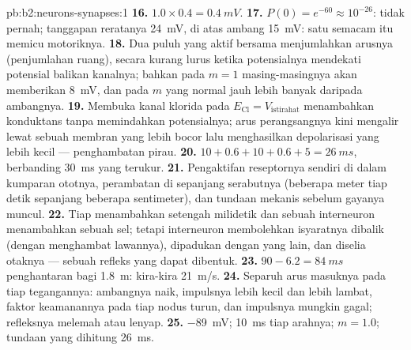 \begin{solution}{pb:b2:neurons-synapses:1}
\textbf{16.} $1.0\times 0.4 = \qty{0.4}{mV}$.
\textbf{17.} $P(0) = e^{-60} \approx 10^{-26}$: tidak pernah;
tanggapan reratanya \qty{24}{mV}, di atas ambang \qty{15}{mV}: satu
 semacam itu memicu  motoriknya.
\textbf{18.} Dua puluh  yang aktif bersama menjumlahkan arusnya
(penjumlahan ruang), secara kurang lurus ketika potensialnya mendekati
potensial balikan kanalnya; bahkan pada $m = 1$ masing-masingnya akan
memberikan \qty{8}{mV}, dan pada $m$ yang normal jauh lebih banyak
daripada ambangnya.
\textbf{19.} Membuka kanal klorida pada $E_{\mathrm{Cl}} = V_{\text{istirahat}}$
menambahkan konduktans tanpa memindahkan potensialnya; arus
perangsangnya kini mengalir lewat sebuah membran yang lebih bocor lalu
menghasilkan depolarisasi yang lebih kecil --- penghambatan pirau.
\textbf{20.} $10 + 0.6 + 10 + 0.6 + 5 = \qty{26}{ms}$, berbanding
\qty{30}{ms} yang terukur.
\textbf{21.} Pengaktifan reseptornya sendiri di dalam kumparan ototnya,
perambatan   di sepanjang serabutnya
(beberapa meter tiap detik sepanjang beberapa sentimeter), dan tundaan
mekanis sebelum gayanya muncul.
\textbf{22.} Tiap  menambahkan setengah milidetik dan sebuah
interneuron menambahkan sebuah sel; tetapi interneuron membolehkan
isyaratnya dibalik (dengan menghambat lawannya), dipadukan dengan yang
lain, dan diselia otaknya --- sebuah refleks yang dapat dibentuk.
\textbf{23.} $90 - 6.2 = \qty{84}{ms}$ penghantaran bagi \qty{1.8}{m}:
kira-kira \qty{21}{m/s}.
\textbf{24.} Separuh arus masuknya pada tiap tegangannya: ambangnya
naik, impulsnya lebih kecil dan lebih lambat, faktor keamanannya pada
tiap nodus turun, dan impulsnya mungkin gagal; refleksnya melemah atau
lenyap.
\textbf{25.}  \qty{-89}{mV}; \qty{10}{ms} tiap
arahnya; $m = 1.0$; tundaan yang dihitung \qty{26}{ms}.
\end{solution}
